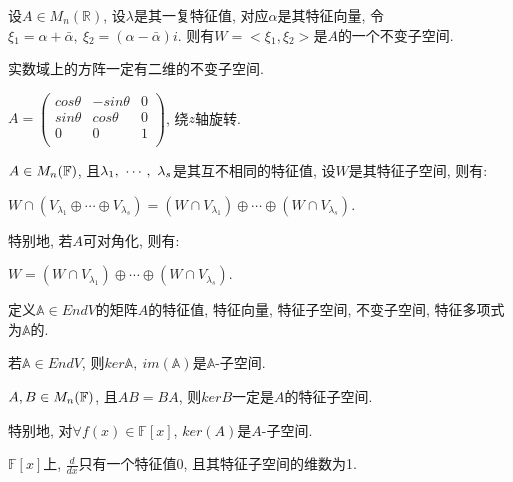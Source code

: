 \begin{example}
    设$A\in M_n(\mathbb{R})$, 设$\lambda$是其一复特征值, 对应$\alpha$是其特征向量, 令$\xi{_1}=\alpha + \bar{\alpha},\ \xi{_2}=(\alpha-\bar{\alpha})i$.
    则有$W=<\xi{_1}, \xi{_2}>$是$A$的一个不变子空间.\par
    实数域上的方阵一定有二维的不变子空间.
\end{example}

\begin{example}
    $A=\begin{pmatrix}
        cos\theta & -sin\theta & 0\\
        sin\theta & cos\theta  & 0\\
        0         & 0          & 1\\
    \end{pmatrix}$, 绕$z$轴旋转.
\end{example}

\begin{example}
    $A\in M_{n}(\mathbb{F})$, 且${\lambda}{_1},\ \cdots,\ {\lambda}{_{s}}$是其互不相同的特征值, 设$W$是其特征子空间, 则有:\par
    $W\cap(V_{\lambda{_1}}\oplus\cdots\oplus V_{\lambda{_s}})=(W\cap V_{\lambda{_1}})\oplus\cdots\oplus(W\cap V_{\lambda{_s}})$.\par
    特别地, 若$A$可对角化, 则有:\par
    $W=(W\cap V_{\lambda{_1}})\oplus\cdots\oplus (W\cap V_{\lambda{_s}})$.
\end{example}

\begin{definition}[线性变换的特征值等]
    定义$\mathbb{A}\in EndV$的矩阵$A$的特征值, 特征向量, 特征子空间, 不变子空间, 特征多项式为$\mathbb{A}$的.
\end{definition}

\begin{example}
    若$\mathbb{A}\in EndV$, 则$ker\mathbb{A},\ im(\mathbb{A})$是$\mathbb{A}$-子空间.
\end{example}

\begin{example}
    $A,B\in M_{n}(\mathbb{F})$, 且$AB=BA$, 则$kerB$一定是$A$的特征子空间.\par
    特别地, 对$\forall f(x)\in \mathbb{F}[x]$, $ker(A)$是$A$-子空间.
\end{example}

\begin{example}
    $\mathbb{F}[x]$上, $\frac{d}{dx}$只有一个特征值$0$, 且其特征子空间的维数为1.
\end{example}

